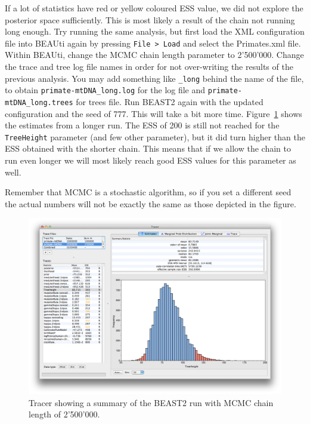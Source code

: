\documentclass[11pt]{article}
\begin{document}
If a lot of statistics have red or yellow coloured ESS value, we did not explore the posterior space sufficiently. This is most likely a result of the chain not running long enough. Try running the same analysis, but first load the XML configuration file into BEAUti again by pressing \texttt{File > Load} and select the Primates.xml file.  Within BEAUti, change the MCMC chain length parameter to 2'500'000. Change the trace and tree log file names in order for not over-writing the results of the previous analysis. You may add something like \texttt{\_long} behind the name of the file, to obtain \texttt{primate-mtDNA\_long.log} for the log file and \texttt{primate-mtDNA\_long.trees} for trees file. Run BEAST2 again with the updated configuration and the seed of 777. This will take a bit more time. Figure~\ref{fig:tracer_better} shows the estimates from a longer run. The ESS of 200 is still not reached for the \texttt{TreeHeight} parameter (and few other parameter), but it did turn higher than the ESS obtained with the shorter chain. This means that if we allow the chain to run even longer we will most likely reach good ESS values for this parameter as well.

Remember that MCMC is a stochastic algorithm, so if you set a different seed the actual numbers will not be exactly the same as those depicted in the figure.%

\begin{figure}[H]
\centering
\includegraphics[width=5in]{figures/tracer_better.png}
\caption{\small Tracer showing a summary of the BEAST2 run with MCMC chain length of 2'500'000.}
\label{fig:tracer_better}
\end{figure}
\end{document}
